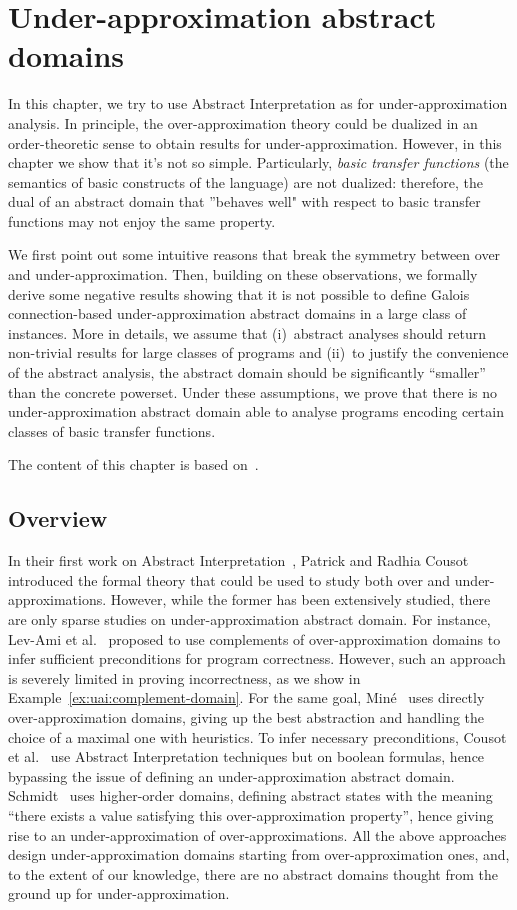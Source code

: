 
\chapter{Under-approximation abstract domains}\label{ch:uai}
In this chapter, we try to use Abstract Interpretation as for under-approximation analysis. In principle, the over-approximation theory could be dualized in an order-theoretic sense to obtain results for under-approximation. However, in this chapter we show that it's not so simple. Particularly, \emph{basic transfer functions} (the semantics of basic constructs of the language) are not dualized: therefore, the dual of an abstract domain that ''behaves well" with respect to basic transfer functions may not enjoy the same property.

We first point out some intuitive reasons that break the symmetry between over and under-approximation. Then, building on these observations, we formally derive some negative results showing that it is not possible to define Galois connection-based under-approximation abstract domains in a large class of instances. More in details, we assume that (i)~abstract analyses should return non-trivial results for large classes of programs and (ii)~to justify the convenience of the abstract analysis, the abstract domain should be significantly “smaller” than the concrete powerset. Under these assumptions, we prove that there is no under-approximation abstract domain able to analyse programs encoding certain classes of basic transfer functions.

The content of this chapter is based on~\cite{ABG22,ABG24}.

\section{Overview}
In their first work on Abstract Interpretation~\cite{CC77}, Patrick and Radhia Cousot introduced the formal theory that could be used to study both over and under-approximations.
However, while the former has been extensively studied, there are only sparse studies on under-approximation abstract domain.
For instance, Lev-Ami et al.~\cite{LSRG07} proposed to use complements of over-approximation domains to infer sufficient preconditions for program correctness. However, such an approach is severely limited in proving incorrectness, as we show in Example~\ref{ex:uai:complement-domain}.
For the same goal, Miné~\cite{Mine14} uses directly over-approximation domains, giving up the best abstraction and handling the choice of a maximal one with heuristics.
To infer necessary preconditions, Cousot et al.~\cite{CCL11,CCFL13} use Abstract Interpretation techniques but on boolean formulas, hence bypassing the issue of defining an under-approximation abstract domain.
Schmidt~\cite{Schmidt07} uses higher-order domains, defining abstract states with the meaning ``there exists a value satisfying this over-approximation property'', hence giving rise to an under-approximation of over-approximations.
All the above approaches design under-approximation domains starting from over-approximation ones, and, to the extent of our knowledge, there are no abstract domains thought from the ground up for under-approximation.

